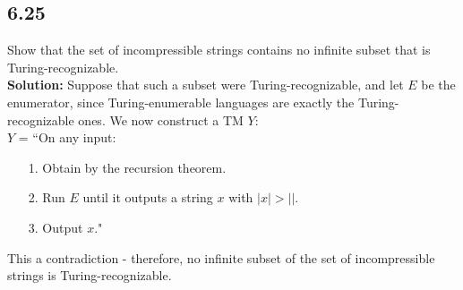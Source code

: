 \subsection*{6.25} Show that the set of incompressible strings contains no infinite subset that is Turing-recognizable.
\\
\textbf{Solution:} Suppose that such a subset were Turing-recognizable, and let $E$ be the enumerator, since Turing-enumerable languages are exactly the Turing-recognizable ones. We now construct a TM $Y$:
\\
$Y$ = ``On any input:
\begin{enumerate}
\itemsep0em
\item[1.]Obtain  by the recursion theorem.
\item[2.]Run $E$ until it outputs a string $x$ with $|x| > |$$|$.
\item[3.]Output $x$."
\end{enumerate}
This a contradiction - therefore, no infinite subset of the set of incompressible strings is Turing-recognizable.